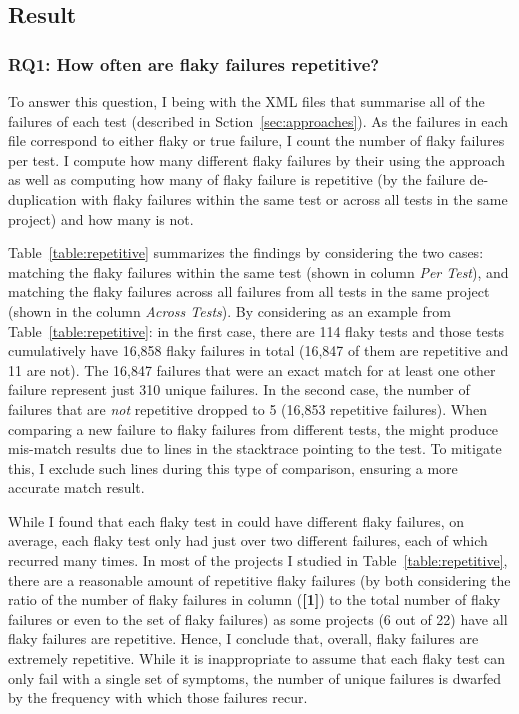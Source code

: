 \subsection{Result}
\label{matchingResult}
\subsubsection{RQ1: How often are flaky failures repetitive?}
\label{matchingRQ1}





To answer this question, I being with the XML files that summarise all of the failures of each test (described in Sction~\ref{sec:approaches}).
As the failures in each file correspond to either flaky or true failure, I count the number of flaky failures per test. I compute how many different flaky failures by their \failures using the \syntax approach as well as computing how many of flaky failure is repetitive (by the failure de-duplication with flaky failures within the same test or across all tests in the same project) and how many is not. 

Table~\ref{table:repetitive} summarizes the findings by considering the two cases: matching the flaky failures within the same test (shown in column \emph{Per Test}), and matching the flaky failures across all failures from all tests in the same project (shown in the column \emph{Across Tests}). 
By considering \alluxio as an example from Table~\ref{table:repetitive}: in the first case, there are 114 flaky tests and those tests cumulatively have 16,858 flaky failures in total (16,847 of them are repetitive and 11 are not). 
The 16,847 failures that were an exact match for at least one other failure represent just 310 unique failures.
In the second case, the number of failures that are \emph{not} repetitive dropped to 5 (16,853 repetitive failures).  
When comparing a new failure to flaky failures from different tests, the \syntax might produce mis-match results due to lines in the stacktrace pointing to the test. To mitigate this, I exclude such lines during this type of comparison, ensuring a more accurate match result.

While I found that each flaky test in \alluxio could have different flaky failures, on average, each flaky test only had just over two different failures, each of which recurred many times.
In most of the projects I studied in Table~\ref{table:repetitive}, there are a reasonable amount of repetitive flaky failures (by both considering the ratio of the number of flaky failures in column (\textbf{[1]}) to the total number of flaky failures or even to the set of flaky failures) as some projects (6 out of 22) have all flaky failures are repetitive.
Hence, I conclude that, overall, flaky failures are extremely repetitive.
While it is inappropriate to assume that each flaky test can only fail with a single set of symptoms, the number of unique failures is dwarfed by the frequency with which those failures recur.

